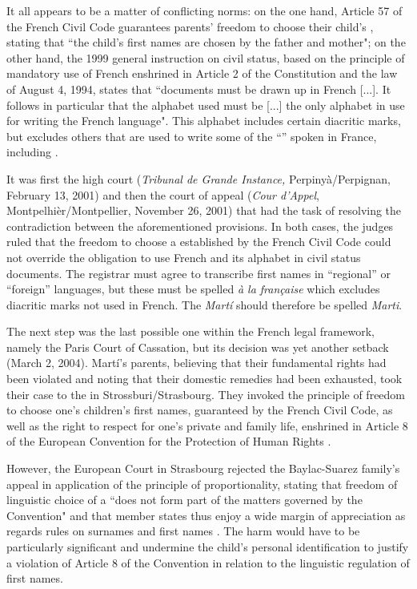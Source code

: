 \documentclass[output=paper,colorlinks,citecolor=brown]{langscibook}
\begin{document}
It all appears to be a matter of conflicting norms: on the one hand, Article 57 of the French Civil Code guarantees parents' freedom to choose their child's , stating that ``the child's first names are chosen by the father and mother"; on the other hand, the 1999 general instruction on civil status, based on the principle of mandatory use of French enshrined in Article 2 of the Constitution and the law of August 4, 1994, states that ``documents must be drawn up in French [...]. It follows in particular that the alphabet used must be [...] the only alphabet in use for writing the French language". This alphabet includes certain diacritic marks, but excludes others that are used to write some of the ``” spoken in France, including .

It was first the high court (\textit{Tribunal de Grande Instance,} Perpinyà\slash Perpignan, February 13, 2001) and then the court of appeal (\textit{Cour d'Appel}, Montpelhièr/Mont\-pell\-ier, November 26, 2001) that had the task of resolving the contradiction between the aforementioned provisions. In both cases, the judges ruled that the freedom to choose a  established by the French Civil Code could not override the obligation to use French and its alphabet in civil status documents. The registrar must agree to transcribe first names in ``regional” or ``foreign” languages, but these must be spelled \textit{à la française} which excludes diacritic marks not used in French. The  \textit{Martí} should therefore be spelled \textit{Marti}.

The next step was the last possible one within the French legal framework, namely the Paris Court of Cassation, but its decision was yet another setback (March 2, 2004). Martí's parents, believing that their fundamental rights had been violated and noting that their domestic remedies had been exhausted, took their case to the  in Strossburi\slash Strasbourg. They invoked the principle of freedom to choose one's children's first names, guaranteed by the French Civil Code, as well as the right to respect for one’s private and family life, enshrined in Article 8 of the European Convention for the Protection of Human Rights \citep{sm:Ravasi2017}. 

However, the European Court in Strasbourg rejected the Baylac\hyp Suarez family's appeal in application of the principle of proportionality, stating that freedom of linguistic choice of a  ``does not form part of the matters governed by the Convention" and that member states thus enjoy a wide margin of appreciation as regards rules on surnames and first names \citep{sm:ECHR2012}. The harm would have to be particularly significant and undermine the child's personal identification to justify a violation of Article 8 of the Convention in relation to the linguistic regulation of first names.
\end{document}
